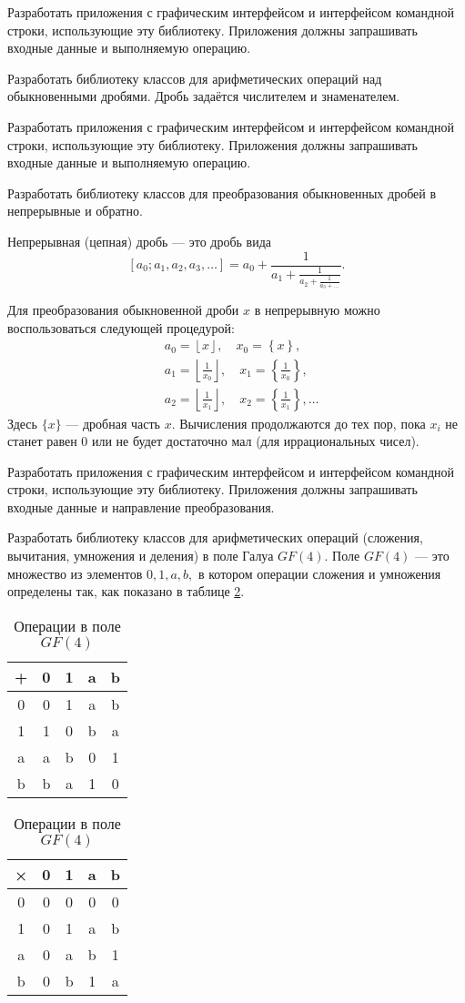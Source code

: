 Разработать приложения с графическим интерфейсом и интерфейсом
командной строки, использующие эту библиотеку. Приложения должны
запрашивать входные данные и выполняемую операцию.

\task Разработать библиотеку классов для арифметических операций над
обыкновенными дробями. Дробь задаётся числителем и знаменателем.

Разработать приложения с графическим интерфейсом и интерфейсом
командной строки, использующие эту библиотеку. Приложения должны
запрашивать входные данные и выполняемую операцию.

\task Разработать библиотеку классов для преобразования обыкновенных
дробей в непрерывные и обратно.

Непрерывная (цепная) дробь — это
дробь вида
\[
[a_0; a_1, a_2, a_3, \dots] = a_0 + \frac1{a_1 + \frac1{a_2 + \frac1{a_3 + \dots}}}.
\]

Для преобразования обыкновенной дроби $x$ в непрерывную можно
воспользоваться следующей процедурой:
\begin{align*}
&a_0 = \left\lfloor x \right\rfloor,\quad x_0 = \left\{x\right\},\\
&a_1 = \left\lfloor \frac1{x_0} \right\rfloor,\quad x_1 = \left\{\frac1{x_0}\right\},\\
&a_2 = \left\lfloor \frac1{x_1} \right\rfloor,\quad x_2 = \left\{\frac1{x_1}\right\}, \dots
\end{align*}
Здесь $\{x\}$ — дробная часть $x$. Вычисления продолжаются до тех пор,
пока $x_i$ не станет равен $0$ или не будет достаточно мал (для
иррациональных чисел).

Разработать приложения с графическим интерфейсом и интерфейсом
командной строки, использующие эту библиотеку. Приложения должны
запрашивать входные данные и направление преобразования.

\task Разработать библиотеку классов для арифметических операций
(сложения, вычитания, умножения и деления) в поле Галуа
$GF(4)$. Поле $GF(4)$ — это множество из
элементов ${0, 1, a, b},$ в котором операции сложения и умножения
определены так, как показано в таблице \ref{table:GF4}.

\begin{table}
  \parbox{.45\linewidth}{
    \centering
    \begin{tabular}{c|cccc}
      +&0&1&a&b\\
      \hline
      0&0&1&a&b\\
      1&1&0&b&a\\
      a&a&b&0&1\\
      b&b&a&1&0
    \end{tabular}
  }
  \hfill
  \parbox{.45\linewidth}{
    \centering
    \begin{tabular}{c|cccc}
      ×&0&1&a&b\\
      \hline
      0&0&0&0&0\\
      1&0&1&a&b\\
      a&0&a&b&1\\
      b&0&b&1&a
    \end{tabular}
  }
\caption{Операции в поле $GF(4)$}\label{table:GF4}
\end{table}

